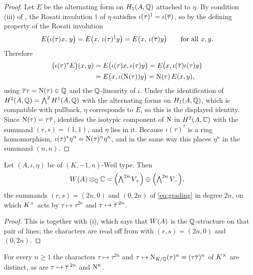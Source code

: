 \begin{proof}
Let $E$ be the alternating form on $H_{1}(A,\mathbb{Q})$ attached to $\eta$. By
condition (iii) of , the Rosati involution $\dagger$ of
$\eta$ satisfies $\iota(\tau)^{\dagger}=\iota(\overline{\tau})$, so by the
defining property of the Rosati involution
\[
  E\bigl(\iota(\tau)x,\,y\bigr)=E\bigl(x,\,\iota(\tau)^{\dagger}y\bigr)
  =E\bigl(x,\,\iota(\overline{\tau})y\bigr)
  \qquad\text{for all }x,y .
\]
Therefore
\begin{align*}
  \bigl(\iota(\tau)^{*}E\bigr)(x,y)
  &=E\bigl(\iota(\tau)x,\iota(\tau)y\bigr)
   =E\bigl(x,\iota(\overline{\tau})\iota(\tau)y\bigr)\\
  &=E\bigl(x,\iota(\mathrm{N}(\tau))y\bigr)=\mathrm{N}(\tau)\,E(x,y),
\end{align*}
using $\overline{\tau}\tau=\mathrm{N}(\tau)\in\mathbb{Q}$ and the $\mathbb{Q}$-linearity of $\iota$.
Under the identification of $H^{2}(A,\mathbb{Q})=\bigwedge^{2}H^{1}(A,\mathbb{Q})$ with the
alternating forms on $H_{1}(A,\mathbb{Q})$, which is compatible with pullback, $\eta$
corresponds to $E$, so this is the displayed identity. Since
$\mathrm{N}(\tau)=\tau\overline{\tau}$,  identifies the isotypic
component of $\mathrm{N}$ in $H^{2}(A,\mathbb{C})$ with the summand $(r,s)=(1,1)$, and
$\eta$ lies in it. Because $\iota(\tau)^{*}$ is a ring homomorphism,
$\iota(\tau)^{*}\eta^{n}=\mathrm{N}(\tau)^{n}\eta^{n}$, and in the same way this
places $\eta^{n}$ in the summand $(n,n)$.
\end{proof}

\begin{lemma}\label{lem:weilchar}
Let $(A,\iota,\eta)$ be of $(K,-1,n)$-Weil type. Then
\[
  W(A)\otimes_{\mathbb{Q}}\mathbb{C}
  =\Bigl(\textstyle\bigwedge^{2n}V_{+}\Bigr)\oplus
   \Bigl(\textstyle\bigwedge^{2n}V_{-}\Bigr),
\]
the summands $(r,s)=(2n,0)$ and $(0,2n)$ of \eqref{eq:grading} in degree $2n$,
on which $K^{\times}$ acts by $\tau\mapsto\tau^{2n}$ and $\tau\mapsto\overline{\tau}^{\,2n}$.
\end{lemma}

\begin{proof}
This is  together with (i), which says
that $W(A)$ is the $\mathbb{Q}$-structure on that pair of lines; the characters are
read off from  with $(r,s)=(2n,0)$ and $(0,2n)$.
\end{proof}

\begin{lemma}\label{lem:charsdiffer}
For every $n\ge1$ the characters $\tau\mapsto\tau^{2n}$ and
$\tau\mapsto\mathrm{N}_{K/\mathbb{Q}}(\tau)^{n}=(\tau\overline{\tau})^{n}$ of $K^{\times}$ are distinct,
as are $\tau\mapsto\overline{\tau}^{\,2n}$ and $\mathrm{N}^{n}$.
\end{lemma}

